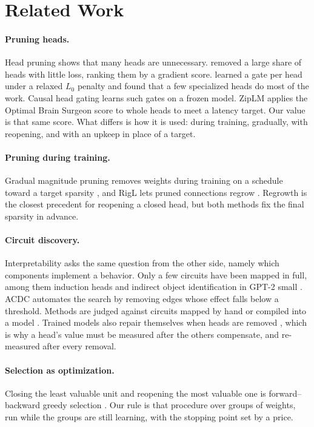 \documentclass[letterpaper]{article} %
\begin{document}
\section{Related Work}

\paragraph{Pruning heads.} Head pruning shows that many heads are unnecessary. \citet{michel2019sixteen} removed a large share of heads with little loss, ranking them by a gradient score. \citet{voita2019analyzing} learned a gate per head under a relaxed $L_0$ penalty \citep{louizos2018learning} and found that a few specialized heads do most of the work. Causal head gating \citep{nam2025chg} learns such gates on a frozen model. ZipLM \citep{ziplm} applies the Optimal Brain Surgeon score \citep{obs} to whole heads to meet a latency target. Our value is that same score. What differs is how it is used: during training, gradually, with reopening, and with an upkeep in place of a target.

\paragraph{Pruning during training.} Gradual magnitude pruning removes weights during training on a schedule toward a target sparsity \citep{zhu2017prune}, and RigL lets pruned connections regrow \citep{evci2020rigging}. Regrowth is the closest precedent for reopening a closed head, but both methods fix the final sparsity in advance.

\paragraph{Circuit discovery.} Interpretability asks the same question from the other side, namely which components implement a behavior. Only a few circuits have been mapped in full, among them induction heads \citep{olsson2022} and indirect object identification in GPT-2 small \citep{wang2023interpretability}. ACDC \citep{conmy2023towards} automates the search by removing edges whose effect falls below a threshold. Methods are judged against circuits mapped by hand or compiled into a model \citep{lindner2023tracr,gupta2024interpbench}. Trained models also repair themselves when heads are removed \citep{mcgrath2023hydra}, which is why a head's value must be measured after the others compensate, and re-measured after every removal.

\paragraph{Selection as optimization.} Closing the least valuable unit and reopening the most valuable one is forward--backward greedy selection \citep{pudil1994floating,zhang2011foba}. Our rule is that procedure over groups of weights, run while the groups are still learning, with the stopping point set by a price.
\end{document}
